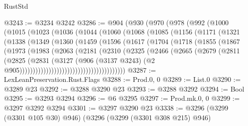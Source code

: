 \begin{lexlean}{RustStd}
\begin{coremodule}
@3243 := @3234 @3242
@3286 := @904
    (@930
      (@970
        (@978
          (@992
            (@1000
              (@1015
                (@1023
                  (@1036
                    (@1044
                      (@1060
                        (@1068
                          (@1085
                            (@1156
                              (@1171
                                (@1321
                                  (@1338
                                    (@1349
                                      (@1360
                                        (@1459
                                          (@1596
                                            (@1617
                                              (@1704
                                                (@1718
                                                  (@1855
                                                    (@1867
                                                      (@1973
                                                        (@1983
                                                          (@2063
                                                            (@2181
                                                              (@2310
                                                                (@2325
                                                                  (@2466
                                                                    (@2665
                                                                      (@2679
                                                                        (@2811
                                                                          (@2825
                                                                            (@2831
                                                                              (@3127
                                                                                (@906
                                                                                  (@3137 @3243)
                                                                                  (@2
                                                                                    @905))))))))))))))))))))))))))))))))))))))))
@3287 := LexLeanPreservation.Rust.Flags
@3288 := Prod.{0, 0}
@3289 := List.{0}
@3290 := @3289 @23
@3292 := @3288 @3290 @23
@3293 := @3288 @3292
@3294 := Bool
@3295 := @3293 @3294
@3296 := @6 @3295
@3297 := Prod.mk.{0, 0}
@3299 := @3297 @3292 @3294
@3301 := @3297 @3290 @23
@3338 := @3296
    (@3299 (@3301 @105 @30) @946)
    (@3296
      (@3299 (@3301 @308 @215) @946)

\end{coremodule}
\end{lexlean}
